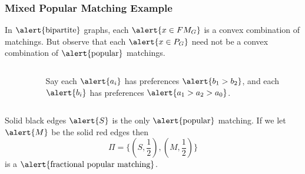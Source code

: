 \documentclass[10pt]{beamer}
\begin{document}
\begin{frame}
\frametitle{Mixed Popular Matching Example}
In $\text{\alert{bipartite}}$ graphs, each $\alert{x \in FM_G}$ is a convex combination of matchings. But observe that each $\alert{x\in P_G}$ need not be a convex combination of $\text{\alert{popular}}$ matchings.
\begin{columns}[T] %
\begin{column}{.48\textwidth}
\begin{figure}
\end{figure}
\end{column}%
\hfill%
\begin{column}{.48\textwidth}
$$ $$
Say each $\alert{a_i}$ has preferences $\alert{b_1 > b_2}$, and each $\alert{b_i}$ has preferences $\alert{a_1 > a_2 > a_0}$.
\end{column}%
\end{columns}
Solid black edges $\alert{S}$ is the only $\text{\alert{popular}}$ matching. If we let $\alert{M}$ be the solid red edges then $$\Pi= \{(S,\frac{1}{2}), (M,\frac{1}{2})\}$$ is a $\text{\alert{fractional popular matching}}$.
\end{frame}
\end{document}
